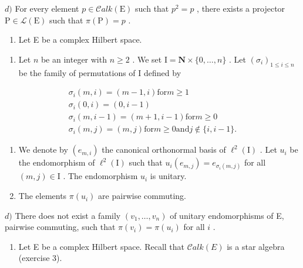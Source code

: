 \(d)\) For every element \(p \in \mathcal{C}alk(\mathrm{E})\) such that \(p^2 = p\) , there exists a projector \(\mathrm{P} \in \mathcal{L}(\mathrm{E})\) such that \(\pi(\mathrm{P}) = p\) .

\begin{enumerate}
\def\labelenumi{\arabic{enumi})}
\setcounter{enumi}{4}
\tightlist
\item
  Let E be a complex Hilbert space.
\end{enumerate}

\begin{enumerate}
\def\labelenumi{\alph{enumi})}
\tightlist
\item
  Let \(n\) be an integer with \(n \geqslant 2\) . We set \(\mathrm{I} = \mathbf{N} \times \{0, \ldots, n\}\) . Let \((\sigma_i)_{1 \leqslant i \leqslant n}\) be the family of permutations of I defined by
\end{enumerate}

\[
\begin{array}{c} \sigma_ {i} (m, i) = (m - 1, i) \text {for} m \geqslant 1 \\ \sigma_ {i} (0, i) = (0, i - 1) \\ \sigma_ {i} (m, i - 1) = (m + 1, i - 1) \text {for} m \geqslant 0 \\ \sigma_ {i} (m, j) = (m, j) \text {for} m \geqslant 0 \text {and} j \notin \{i, i - 1 \}. \end{array}
\]

\begin{enumerate}
\def\labelenumi{\alph{enumi})}
\setcounter{enumi}{1}
\item
  We denote by \((e_{m,i})\) the canonical orthonormal basis of \(\ell^{2}(\mathrm{I})\) . Let \(u_{i}\) be the endomorphism of \(\ell^{2}(\mathrm{I})\) such that \(u_{i}(e_{m,j}) = e_{\sigma_{i}(m,j)}\) for all \((m,j) \in \mathrm{I}\) . The endomorphism \(u_{i}\) is unitary.
\item
  The elements \(\pi(u_i)\) are pairwise commuting.
\end{enumerate}

\(d)\) There does not exist a family \((v_{1},\ldots,v_{n})\) of unitary endomorphisms of E, pairwise commuting, such that \(\pi(v_{i})=\pi(u_{i})\) for all \(i\) .

\begin{enumerate}
\def\labelenumi{\arabic{enumi})}
\setcounter{enumi}{5}
\tightlist
\item
  Let E be a complex Hilbert space. Recall that \(\mathcal{C}alk(E)\) is a star algebra (exercise 3).
\end{enumerate}

